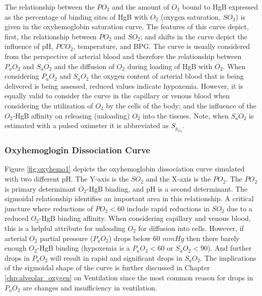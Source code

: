 The relationship between the $PO_2$ and the amount of $O_2$ bound to HgB expressed as the percentage of binding sites of HgB with $O_2$ (oxygen saturation, $SO_2$) is given in the oxyhemoglobin saturation curve. The features of this curve depict, first, the relationship between $PO_2$ and $SO_2$; and shifts in the curve depict the influence of pH, $PCO_2$, temperature, and BPG. The curve is usually considered from the perspective of arterial blood and therefore the relationship between $P_aO_2$ and $S_aO_2$ and the diffusion of $O_2$ during loading of HgB with $O_2$. When considering $P_aO_2$ and $S_aO_2$ the oxygen content of arterial blood that is being delivered is being assessed, reduced values indicate hypoxemia. However, it is equally valid to consider the curve in the capillary or venous blood when considering the utilization of $O_2$ by the cells of the body; and the influence of the $O_2$-HgB affinity on releasing (unloading) $O_2$ into the tissues.
Note, when $S_aO_2$ is estimated with a pulsed oximeter it is abbreviated as $S_p_O_2$.

\subsubsection{Oxyhemoglogin Dissociation Curve}

Figure \ref{fig:oxyhemo1} depicts the oxyhemoglobin dissociation curve simulated with two different pH. The Y-axis is the $SO_2$ and the X-axis is the $PO_2$. The $PO_2$ is primary determinant $O_2$-HgB binding, and pH is a second determinant. The sigmoidal relationship identifies an important area in this relationship. A critical juncture where reductions of $PO_2 < 60$ include rapid reductions in $SO_2$ due to a reduced $O_2$-HgB binding affinity. When considering capillary and venous blood, this is a helpful attribute for unloading $O_2$ for diffusion into cells. However, if arterial $O_2$ partial pressure ($P_aO_2$) drops below 60 $mmHg$ then there barely enough $O_2$-HgB binding (hypoxemia is a $P_aO_2 <60$ or $S_aO_2 < 90$). And further drops in $P_aO_2$ will result in rapid and significant drops in $S_aO_2$. The implications of the sigmoidal shape of the curve is further discussed in Chapter \ref{chp:alveolar_oxygen} on Ventilation since the most common reason for drops in $P_aO_2$ are changes and insufficiency in ventilation. 

